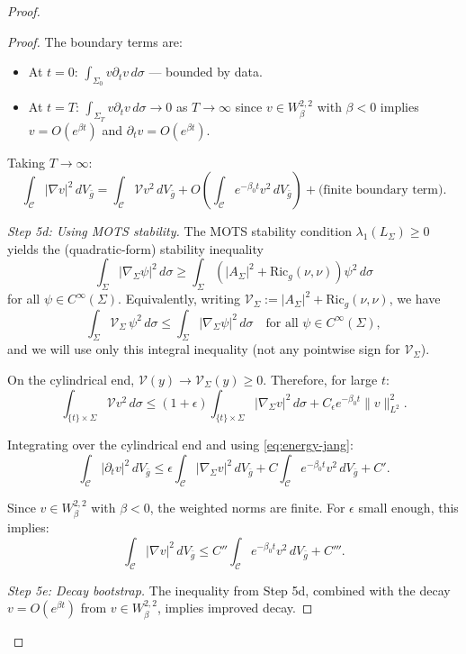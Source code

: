 \documentclass[12pt]{article}
\theoremstyle{plain}
\theoremstyle{definition}
\theoremstyle{remark}
\newcommand{\Ric}{\mathrm{Ric}}
\newcommand{\bg}{\bar{g}}
\begin{document}
\begin{proof}
\begin{proof}
The boundary terms are:
\begin{itemize}
    \item At $t = 0$: $\int_{\Sigma_0} v \partial_t v \, d\sigma$ --- bounded by data.
    \item At $t = T$: $\int_{\Sigma_T} v \partial_t v \, d\sigma \to 0$ as $T \to \infty$ since $v \in W^{2,2}_\beta$ with $\beta < 0$ implies $v = O(e^{\beta t})$ and $\partial_t v = O(e^{\beta t})$.
\end{itemize}

Taking $T \to \infty$:
\begin{equation}\label{eq:energy-jang}
\int_{\mathcal{C}} |\nabla v|^2 \, dV_{\bg} = \int_{\mathcal{C}} \mathcal{V} v^2 \, dV_{\bg} + O\left(\int_{\mathcal{C}} e^{-\beta_0 t} v^2 \, dV_{\bg}\right) + \text{(finite boundary term)}.
\end{equation}

\textit{Step 5d: Using MOTS stability.}
The MOTS stability condition $\lambda_1(L_\Sigma) \geq 0$ yields the (quadratic-form) stability inequality
\[
\int_\Sigma |\nabla_\Sigma \psi|^2 \, d\sigma \geq \int_\Sigma (|A_\Sigma|^2 + \Ric_g(\nu, \nu))\psi^2 \, d\sigma
\]
for all $\psi \in C^\infty(\Sigma)$.
Equivalently, writing $\mathcal{V}_\Sigma := |A_\Sigma|^2 + \Ric_g(\nu,\nu)$, we have
\[
\int_\Sigma \mathcal{V}_\Sigma\,\psi^2\, d\sigma \leq \int_\Sigma |\nabla_\Sigma \psi|^2\, d\sigma \quad \text{for all } \psi \in C^\infty(\Sigma),
\]
and we will use only this integral inequality (not any pointwise sign for $\mathcal{V}_\Sigma$).

On the cylindrical end, $\mathcal{V}(y) \to \mathcal{V}_\Sigma(y) \geq 0$. Therefore, for large $t$:
\[
\int_{\{t\} \times \Sigma} \mathcal{V} v^2 \, d\sigma \leq (1 + \epsilon) \int_{\{t\} \times \Sigma} |\nabla_\Sigma v|^2 \, d\sigma + C_\epsilon e^{-\beta_0 t} \|v\|_{L^2}^2.
\]

Integrating over the cylindrical end and using \eqref{eq:energy-jang}:
\[
\int_{\mathcal{C}} |\partial_t v|^2 \, dV_{\bg} \leq \epsilon \int_{\mathcal{C}} |\nabla_\Sigma v|^2 \, dV_{\bg} + C \int_{\mathcal{C}} e^{-\beta_0 t} v^2 \, dV_{\bg} + C'.
\]

Since $v \in W^{2,2}_\beta$ with $\beta < 0$, the weighted norms are finite. For $\epsilon$ small enough, this implies:
\[
\int_{\mathcal{C}} |\nabla v|^2 \, dV_{\bg} \leq C'' \int_{\mathcal{C}} e^{-\beta_0 t} v^2 \, dV_{\bg} + C'''.
\]

\textit{Step 5e: Decay bootstrap.}
The inequality from Step 5d, combined with the decay $v = O(e^{\beta t})$ from $v \in W^{2,2}_\beta$, implies improved decay. 


\end{proof}
\end{proof}
\end{document}

